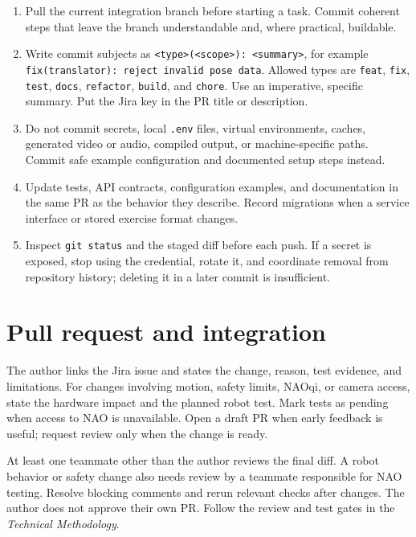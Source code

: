 \documentclass[12pt,a4paper]{article}
\begin{document}
\begin{enumerate}

\item Pull the current integration branch before starting a task. Commit coherent steps that leave the branch understandable and, where practical, buildable.

\item Write commit subjects as \texttt{\textless{}type\textgreater{}(\textless{}scope\textgreater{}): \textless{}summary\textgreater{}}, for example \texttt{fix(translator): reject invalid pose data}. Allowed types are \texttt{feat}, \texttt{fix}, \texttt{test}, \texttt{docs}, \texttt{refactor}, \texttt{build}, and \texttt{chore}. Use an imperative, specific summary. Put the Jira key in the PR title or description.

\item Do not commit secrets, local \texttt{.env} files, virtual environments, caches, generated video or audio, compiled output, or machine-specific paths. Commit safe example configuration and documented setup steps instead.

\item Update tests, API contracts, configuration examples, and documentation in the same PR as the behavior they describe. Record migrations when a service interface or stored exercise format changes.

\item Inspect \texttt{git status} and the staged diff before each push. If a secret is exposed, stop using the credential, rotate it, and coordinate removal from repository history; deleting it in a later commit is insufficient.

\end{enumerate}

\section{Pull request and integration}

The author links the Jira issue and states the change, reason, test evidence, and limitations. For changes involving motion, safety limits, NAOqi, or camera access, state the hardware impact and the planned robot test. Mark tests as pending when access to NAO is unavailable. Open a draft PR when early feedback is useful; request review only when the change is ready.

At least one teammate other than the author reviews the final diff. A robot behavior or safety change also needs review by a teammate responsible for NAO testing. Resolve blocking comments and rerun relevant checks after changes. The author does not approve their own PR. Follow the review and test gates in the \emph{Technical Methodology}.
\end{document}
